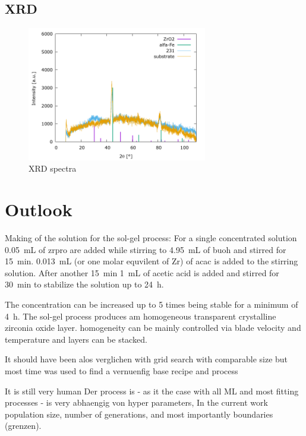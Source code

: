 \documentclass[a4paper]{article}
\newcommand{\picwidth}{0.7\textwidth}
\newcommand{\ml}[1]{\SI{#1}{\milli\liter}}
\newcommand{\minutes}[1]{\SI{#1}{\minute}}
\newcommand{\h}[1]{\SI{#1}{\hour}}
\begin{document}
\subsection{XRD}

\begin{figure}
	\centering
	\includegraphics[width=\picwidth]{Pics/xrd.png}
	\caption{XRD spectra}
	\label{fig:xrd}
\end{figure}
\section{Outlook}

Making of the solution for the sol-gel process:
For a single concentrated solution \ml{0.05} of \gls{zrpro} are added while stirring to \ml{4.95} of \gls{buoh} and stirred for \minutes{15}. 
\ml{0.013} (or one molar equvilent of Zr) of \gls{acac} is added to the stirring solution. 
After another \minutes{15} \ml{1} of acetic acid is added and stirred for \minutes{30} to stabilize the solution up to \h{24}. 

The concentration can be increased up to 5 times being stable for a minimum of \h{4}. 
The sol-gel process produces am homogeneous transparent crystalline zirconia oxide layer. 
homogeneity can be mainly controlled via blade velocity and temperature and layers can be stacked.

It should have been alos verglichen with grid search with comparable size
but most time was used to find a vernuenfig base recipe and process

It is still very human 
Der process is - as it the case with all ML and most fitting processes - is very abhaengig von hyper parameters, 
In the current work population size, number of generations, and most importantly boundaries (grenzen). 




\end{document}
